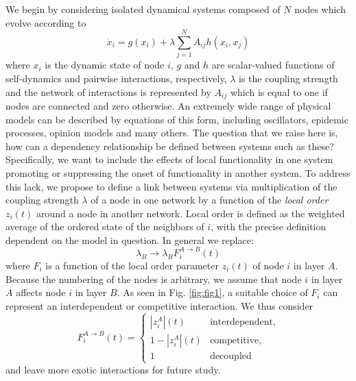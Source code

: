 \documentclass[pre,twocolumn,superscriptaddress]{revtex4}
\newcommand{\1}{\mathds{1}}
\begin{document}
{
We begin by considering isolated dynamical systems composed of $N$ nodes which evolve according to
\begin{equation}\label{eq:0}
    \dot{x}_i = g(x_i) + \lambda \sum_{j=1}^N A_{ij} h(x_i,x_j)
\end{equation}
where $x_i$ is the dynamic state of node $i$, $g$ and $h$ are scalar-valued functions of self-dynamics and pairwise interactions, respectively, $\lambda$ is the coupling strength and the network of interactions is represented by $A_{ij}$ which is equal to one if nodes are connected and zero otherwise.
An extremely wide range of physical models can be described by equations of this form, including oscillators, epidemic processes, opinion models and many others.
The question that we raise here is, how can a dependency relationship be defined between systems such as these?
Specifically, we want to include the effects of local functionality in one system promoting or suppressing the onset of functionality in another system.
To address this lack, we propose to define a link between systems via multiplication of the coupling strength $\lambda$ of a node in one network by a function of the \textit{local order} $z_i(t)$ around a node in another network. 
Local order is defined as the weighted average of the ordered state of the neighbors of $i$, with the precise definition dependent on the model in question.  In general we replace:
\begin{equation}
    \lambda_B \rightarrow \lambda_B F_i^{A\to B}(t)
\end{equation}
where $F_i$ is a function of the local order parameter $z_i(t)$ of node $i$ in layer $A$.  Because the numbering of the nodes is arbitrary, we assume that node $i$ in layer $A$ affects node $i$ in layer $B$.  As seen in Fig. \ref{fig:fig1}, a suitable choice of $F_i$ can represent an interdependent or competitive interaction.
We thus consider
\begin{equation}\label{eq:interaction}
F_i^{A\to B}(t) = 
\begin{cases}
\left|z_i^{A}\right|(t) & \mbox{interdependent},\\
1 - \left|z_i^{A}\right|(t) & \mbox{competitive},\\
1 & \mbox{decoupled}
\end{cases}
\end{equation}
and leave more exotic interactions for future study.

}
\end{document}
